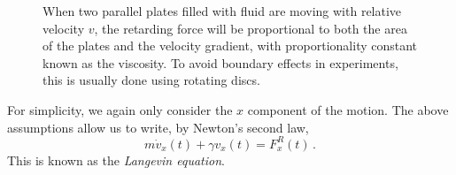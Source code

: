 \documentclass{article}
\theoremstyle{plain}\theoremheaderfont{\normalfont\bfseries}\theorembodyfont{\rmfamily}\theoremseparator{.}\newtheorem*{thm}{Theorem}\newtheorem*{law}{Law}\newtheorem*{pos}{Postulate}
\numberwithin{equation}{section}
\newcommand{\pdv}[3][]{\frac{\partial^{#1} #2}{{\partial #3}^{#1}}}
\begin{document}
    \begin{figure}
        \centering
        \caption{When two parallel plates filled with fluid are moving with relative velocity \(v\), the retarding force will be proportional to both the area of the plates and the velocity gradient, with proportionality constant known as the viscosity. To avoid boundary effects in experiments, this is usually done using rotating discs.}
    \end{figure}

    For simplicity, we again only consider the \(x\) component of the motion. The above assumptions allow us to write, by Newton's second law,
    \begin{equation}\label{Langevin}
        m\dot{v}_x(t)+\gamma v_x(t)=F_x^R(t)\,.
    \end{equation}
    This is known as the \textit{Langevin equation}.
\end{document}
